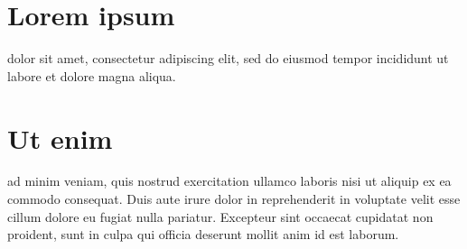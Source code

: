 \documentclass{article}
\begin{document}
\section{Lorem ipsum}

dolor sit amet, consectetur adipiscing elit, sed do eiusmod tempor
incididunt ut labore et dolore magna aliqua.

\section{Ut enim}
ad minim veniam, quis nostrud exercitation ullamco laboris nisi ut aliquip ex
ea commodo consequat. Duis aute irure dolor in reprehenderit in voluptate
velit esse cillum dolore eu fugiat nulla pariatur. Excepteur sint occaecat
cupidatat non proident, sunt in culpa qui officia deserunt mollit anim id est
laborum.
\end{document}
